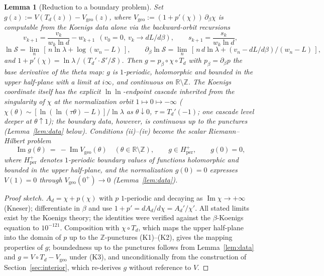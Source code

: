 \documentclass[11pt]{article}
\newtheorem{lemma}[theorem]{Lemma}
\newcommand{\R}{\mathbb{R}}
\newcommand{\Z}{\mathbb{Z}}
\begin{document}
\begin{lemma}[Reduction to a boundary problem]\label{lem:reduction}
Set $g(z):=V(T_d(z))-V_{\mathrm{geo}}(z)$, where
$V_{\mathrm{geo}}:=(1+p'(\chi))\,\partial_\beta\chi$ is computable from the
Koenigs data alone via the backward-orbit recursions
\[
  v_{k+1}=\frac{v_k}{w_k\ln d}-w_{k+1}\ \ (v_0=0,\ v_k\to dL/d\beta),\qquad
  s_{k+1}=\frac{s_k}{w_k\ln d},
\]
\[
  \ln\mathcal S=\lim_n\,[\,n\ln\lambda+\log(w_n-L)\,],\qquad
  \partial_\beta\ln\mathcal S=\lim_n\,[\,n\,d\ln\lambda+(v_n-dL/d\beta)/(w_n-L)\,],
\]
and $1+p'(\chi)=\ln\lambda\,/\,(T_d'\cdot\mathcal S'/\mathcal S)$.
Then $g=p_\beta\circ\chi\circ T_d$ with $p_\beta=\partial_\beta p$ the
base derivative of the theta map: $g$ is $1$-periodic, holomorphic and
bounded in the upper half-plane with a limit at $i\infty$, and continuous
on $\R\setminus\Z$.  The Koenigs coordinate itself has the explicit
$\ln\ln$-endpoint cascade inherited from the singularity of
$\chi$ at the normalization orbit $1\mapsto0\mapsto-\infty$
($\chi(\theta)\sim[\ln(\ln(\tau\theta)-L)]/\ln\lambda$ as
$\theta\downarrow0$, $\tau=T_d'(-1)$; one cascade level deeper at
$\theta\uparrow1$); the boundary \emph{data}, however, is continuous up to
the punctures (Lemma~\ref{lem:data} below).  Conditions (ii)--(iv) become
the scalar Riemann--Hilbert problem
\begin{equation}\label{eq:RH}
  \operatorname{Im}g(\theta)\ =\ -\operatorname{Im}V_{\mathrm{geo}}(\theta)
  \quad(\theta\in\R\setminus\Z),
  \qquad
  g\in H^{+}_{\mathrm{per}},
  \qquad
  g(0)=0 ,
\end{equation}
where $H^{+}_{\mathrm{per}}$ denotes $1$-periodic boundary values of
functions holomorphic and bounded in the upper half-plane, and the
normalization $g(0)=0$ expresses $V(1)=0$ through
$V_{\mathrm{geo}}(0^+)\to0$ (Lemma~\ref{lem:data}).
\end{lemma}

\begin{proof}[Proof sketch]
$A_d=\chi+p(\chi)$ with $p$ $1$-periodic and decaying as
$\operatorname{Im}\chi\to+\infty$ (Kneser); differentiate in $\beta$ and
use $1+p'=dA_d/d\chi=A_d'/\chi'$.  All stated limits exist by the Koenigs
theory; the identities were verified against the $\beta$-Koenigs equation
to $10^{-121}$.  Composition with $\chi\circ T_d$, which maps the upper
half-plane into the domain of $p$ up to the $\Z$-punctures (K1)--(K2),
gives the mapping properties of $g$; boundedness up to the punctures
follows from Lemma~\ref{lem:data} and $g=V\circ T_d-V_{\mathrm{geo}}$
under (K3), and unconditionally from the construction of
Section~\ref{sec:interior}, which re-derives $g$ without reference to
$V$.
\end{proof}
\end{document}
